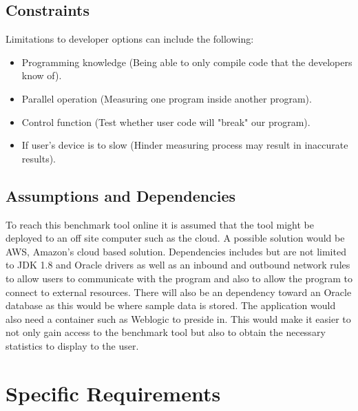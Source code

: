 \documentclass[a4paper,12pt]{article}
\begin{document}
\subsection{Constraints}
Limitations to developer options can include the following:
\begin{itemize}
\item Programming knowledge (Being able to only compile code that the developers know of).
\item Parallel operation (Measuring one program inside another program).
\item Control function (Test whether user code will "break" our program).
\item If user's device is to slow (Hinder measuring process may result in inaccurate results).
\end{itemize}

\subsection{Assumptions and Dependencies}
To reach this benchmark tool online it is assumed that the tool might be deployed to an off site computer such as the cloud. A possible solution would be AWS, Amazon's cloud based solution. Dependencies includes but are not limited to JDK 1.8 and Oracle drivers as well as an inbound and outbound network rules to allow users to communicate with the program and also to allow the program to connect to external resources. There will also be an dependency toward an Oracle database as this would be where sample data is stored. The application would also need a container such as Weblogic to preside in. This would make it easier to not only gain access to the benchmark tool but also to obtain the necessary statistics to display to the user. 

\section{Specific Requirements}
\end{document}
